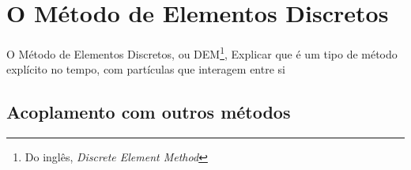\chapter{O Método de Elementos Discretos}

O Método de Elementos Discretos, ou DEM\footnote{Do inglês, \textit{Discrete Element Method}}, \alert{Explicar que é um tipo de método explícito no tempo, com partículas que interagem entre si}

\section{}

\section{Acoplamento com outros métodos}